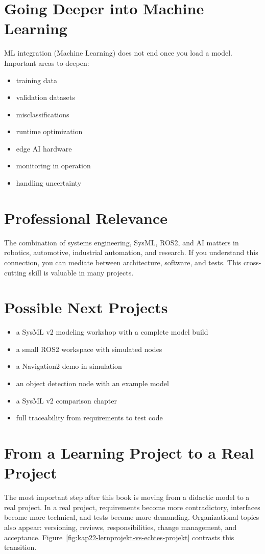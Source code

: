 \section{Going Deeper into Machine Learning}
ML integration (Machine Learning) does not end once you load a model. Important areas to deepen:

\begin{itemize}
    \item training data
    \item validation datasets
    \item misclassifications
    \item runtime optimization
    \item edge AI hardware
    \item monitoring in operation
    \item handling uncertainty
\end{itemize}

\section{Professional Relevance}
The combination of systems engineering, SysML, ROS2, and AI matters in robotics, automotive, industrial automation, and research. If you understand this connection, you can mediate between architecture, software, and tests. This cross-cutting skill is valuable in many projects.

\section{Possible Next Projects}
\begin{itemize}
    \item a SysML v2 modeling workshop with a complete model build
    \item a small ROS2 workspace with simulated nodes
    \item a Navigation2 demo in simulation
    \item an object detection node with an example model
    \item a SysML v2 comparison chapter
    \item full traceability from requirements to test code
\end{itemize}

\section{From a Learning Project to a Real Project}
The most important step after this book is moving from a didactic model to a real project. In a real project, requirements become more contradictory, interfaces become more technical, and tests become more demanding. Organizational topics also appear: versioning, reviews, responsibilities, change management, and acceptance. Figure~\ref{fig:kap22-lernprojekt-vs-echtes-projekt} contrasts this transition.

